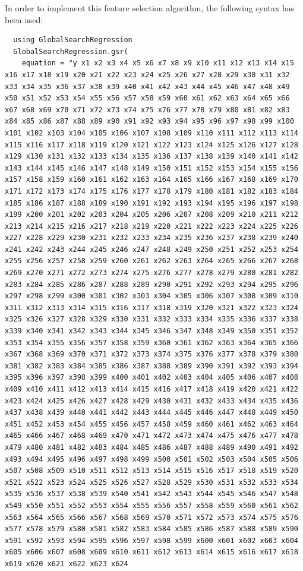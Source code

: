 \documentclass{article}
\begin{document}
In order to implement this feature selection algorithm, the following syntax has been used:

\begin{lstlisting} 
  using GlobalSearchRegression
  GlobalSearchRegression.gsr(
    equation = "y x1 x2 x3 x4 x5 x6 x7 x8 x9 x10 x11 x12 x13 x14 x15 x16 x17 x18 x19 x20 x21 x22 x23 x24 x25 x26 x27 x28 x29 x30 x31 x32 x33 x34 x35 x36 x37 x38 x39 x40 x41 x42 x43 x44 x45 x46 x47 x48 x49 x50 x51 x52 x53 x54 x55 x56 x57 x58 x59 x60 x61 x62 x63 x64 x65 x66 x67 x68 x69 x70 x71 x72 x73 x74 x75 x76 x77 x78 x79 x80 x81 x82 x83 x84 x85 x86 x87 x88 x89 x90 x91 x92 x93 x94 x95 x96 x97 x98 x99 x100 x101 x102 x103 x104 x105 x106 x107 x108 x109 x110 x111 x112 x113 x114 x115 x116 x117 x118 x119 x120 x121 x122 x123 x124 x125 x126 x127 x128 x129 x130 x131 x132 x133 x134 x135 x136 x137 x138 x139 x140 x141 x142 x143 x144 x145 x146 x147 x148 x149 x150 x151 x152 x153 x154 x155 x156 x157 x158 x159 x160 x161 x162 x163 x164 x165 x166 x167 x168 x169 x170 x171 x172 x173 x174 x175 x176 x177 x178 x179 x180 x181 x182 x183 x184 x185 x186 x187 x188 x189 x190 x191 x192 x193 x194 x195 x196 x197 x198 x199 x200 x201 x202 x203 x204 x205 x206 x207 x208 x209 x210 x211 x212 x213 x214 x215 x216 x217 x218 x219 x220 x221 x222 x223 x224 x225 x226 x227 x228 x229 x230 x231 x232 x233 x234 x235 x236 x237 x238 x239 x240 x241 x242 x243 x244 x245 x246 x247 x248 x249 x250 x251 x252 x253 x254 x255 x256 x257 x258 x259 x260 x261 x262 x263 x264 x265 x266 x267 x268 x269 x270 x271 x272 x273 x274 x275 x276 x277 x278 x279 x280 x281 x282 x283 x284 x285 x286 x287 x288 x289 x290 x291 x292 x293 x294 x295 x296 x297 x298 x299 x300 x301 x302 x303 x304 x305 x306 x307 x308 x309 x310 x311 x312 x313 x314 x315 x316 x317 x318 x319 x320 x321 x322 x323 x324 x325 x326 x327 x328 x329 x330 x331 x332 x333 x334 x335 x336 x337 x338 x339 x340 x341 x342 x343 x344 x345 x346 x347 x348 x349 x350 x351 x352 x353 x354 x355 x356 x357 x358 x359 x360 x361 x362 x363 x364 x365 x366 x367 x368 x369 x370 x371 x372 x373 x374 x375 x376 x377 x378 x379 x380 x381 x382 x383 x384 x385 x386 x387 x388 x389 x390 x391 x392 x393 x394 x395 x396 x397 x398 x399 x400 x401 x402 x403 x404 x405 x406 x407 x408 x409 x410 x411 x412 x413 x414 x415 x416 x417 x418 x419 x420 x421 x422 x423 x424 x425 x426 x427 x428 x429 x430 x431 x432 x433 x434 x435 x436 x437 x438 x439 x440 x441 x442 x443 x444 x445 x446 x447 x448 x449 x450 x451 x452 x453 x454 x455 x456 x457 x458 x459 x460 x461 x462 x463 x464 x465 x466 x467 x468 x469 x470 x471 x472 x473 x474 x475 x476 x477 x478 x479 x480 x481 x482 x483 x484 x485 x486 x487 x488 x489 x490 x491 x492 x493 x494 x495 x496 x497 x498 x499 x500 x501 x502 x503 x504 x505 x506 x507 x508 x509 x510 x511 x512 x513 x514 x515 x516 x517 x518 x519 x520 x521 x522 x523 x524 x525 x526 x527 x528 x529 x530 x531 x532 x533 x534 x535 x536 x537 x538 x539 x540 x541 x542 x543 x544 x545 x546 x547 x548 x549 x550 x551 x552 x553 x554 x555 x556 x557 x558 x559 x560 x561 x562 x563 x564 x565 x566 x567 x568 x569 x570 x571 x572 x573 x574 x575 x576 x577 x578 x579 x580 x581 x582 x583 x584 x585 x586 x587 x588 x589 x590 x591 x592 x593 x594 x595 x596 x597 x598 x599 x600 x601 x602 x603 x604 x605 x606 x607 x608 x609 x610 x611 x612 x613 x614 x615 x616 x617 x618 x619 x620 x621 x622 x623 x624 
\end{lstlisting}
\end{document}
